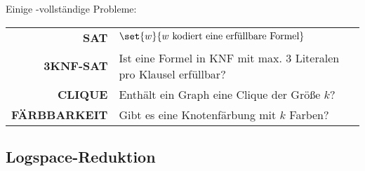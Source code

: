 Einige \npoly-vollständige Probleme:
\begin{center}
	\begin{tabular}{r|l}
		\textbf{SAT} & $\set{w}{w\text{ kodiert eine erfüllbare Formel}}$\\
		\textbf{3KNF-SAT} & Ist eine Formel in KNF mit max. 3 Literalen pro Klausel erfüllbar?\\
		\textbf{CLIQUE} & Enthält ein Graph eine Clique der Größe $k$?\\
		\textbf{FÄRBBARKEIT} & Gibt es eine Knotenfärbung mit $k$ Farben?\\
	\end{tabular}
\end{center}

\subsection{Logspace-Reduktion}
